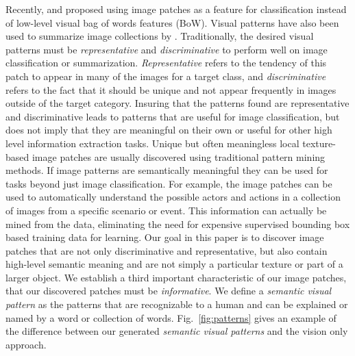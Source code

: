 \documentclass[10pt,twocolumn,letterpaper]{article}
\begin{document}
Recently, \cite{singh2012unsupervised} and \cite{LiLSH15CVPR} proposed using image patches as a feature for classification instead of low-level visual bag of words features (BoW).
Visual patterns have also been used to summarize image collections by \cite{zhang2014scalable}.
Traditionally, the desired visual patterns must be {\it representative} and {\it discriminative} to perform well on image classification or summarization.
{\it Representative} refers to the tendency of this patch to appear in many of the images for a target class, and {\it discriminative} refers to the fact that it should be unique and not appear frequently in images outside of the target category.
Insuring that the patterns found are representative and discriminative leads to patterns that are useful for image classification, but does not imply that they are meaningful on their own or useful for other high level information extraction tasks.
Unique but often meaningless local texture-based image patches are usually discovered using traditional pattern mining methods.
If image patterns are semantically meaningful they can be used for tasks beyond just image classification.
For example, the image patches can be used to automatically understand the possible actors and actions in a collection of images from a specific scenario or event.
This information can actually be mined from the data, eliminating the need for expensive supervised bounding box based training data for learning.
Our goal in this paper is to discover image patches that are not only discriminative and representative, but also contain high-level semantic meaning and are not simply a particular texture or part of a larger object.
We establish a third important characteristic of our image patches, that our discovered patches must be {\it informative}.
We define a {\it semantic visual pattern} as the patterns that are recognizable to a human and can be explained or named by a word or collection of words.
Fig.~\ref{fig:patterns} gives an example of the difference between our generated {\it semantic visual patterns} and the vision only approach.
\end{document}
